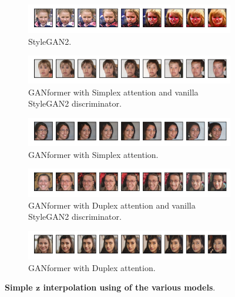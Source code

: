 \documentclass{article}
\begin{document}
\begin{figure}[htpb]
	\centering
	\begin{subfigure}{\linewidth}
		\includegraphics[width=\linewidth]{ffhq-interpolation_Stylegan2.png}
		\vspace{-7mm}
		\caption{StyleGAN2.} 
	\end{subfigure}
	\begin{subfigure}{\linewidth}
		\includegraphics[width=\linewidth]{ffhq-interpolation_GANFormerSimplexNoAtt.png}
		\vspace{-7mm}
		\caption{GANformer with Simplex attention and vanilla StyleGAN2 discriminator.}
	\end{subfigure}
	\begin{subfigure}{\linewidth}
		\includegraphics[width=\linewidth]{ffhq-interpolation_GANFormerSimplexAtt.png}
		\vspace{-7mm}
		\caption{GANformer with Simplex attention.}
	\end{subfigure}
	\begin{subfigure}{\linewidth}
		\includegraphics[width=\linewidth]{ffhq-interpolation_GANFormerDuplexNoAtt.png}
		\vspace{-7mm}
		\caption{GANformer with Duplex attention and vanilla StyleGAN2 discriminator.}
	\end{subfigure}
	\begin{subfigure}{\linewidth}
		\includegraphics[width=\linewidth]{ffhq-interpolation_GANFormerDuplexAtt.png}
		\vspace{-7mm}
		\caption{GANformer with Duplex attention.}
	\end{subfigure}
	\vspace{3mm}
	\caption{\textbf{Simple $\mathbf{z}$ interpolation using of the various models}.} 
	\label{fig:interpolation-ffhq}
\end{figure}
\end{document}
